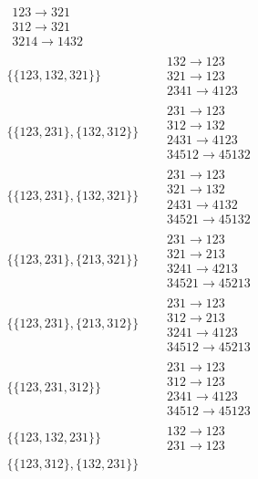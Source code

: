 \begin{tiny}
\begin{align}
\begin{matrix}
123 \to 321\\312 \to 321\\3214 \to 1432
\end{matrix}
\\
\{\{123, 132, 321\}\}
\quad
&
\begin{matrix}
132 \to 123\\321 \to 123\\2341 \to 4123
\end{matrix}
\\
\{\{123, 231\}, \{132, 312\}\}
\quad
&
\begin{matrix}
231 \to 123\\312 \to 132\\2431 \to 4123\\34512 \to 45132
\end{matrix}
\\
\{\{123, 231\}, \{132, 321\}\}
\quad
&
\begin{matrix}
231 \to 123\\321 \to 132\\2431 \to 4132\\34521 \to 45132
\end{matrix}
\\
\{\{123, 231\}, \{213, 321\}\}
\quad
&
\begin{matrix}
231 \to 123\\321 \to 213\\3241 \to 4213\\34521 \to 45213
\end{matrix}
\\
\{\{123, 231\}, \{213, 312\}\}
\quad
&
\begin{matrix}
231 \to 123\\312 \to 213\\3241 \to 4123\\34512 \to 45213
\end{matrix}
\\
\{\{123, 231, 312\}\}
\quad
&
\begin{matrix}
231 \to 123\\312 \to 123\\2341 \to 4123\\34512 \to 45123
\end{matrix}
\\
\{\{123, 132, 231\}\}
\quad
&
\begin{matrix}
132 \to 123\\231 \to 123
\end{matrix}
\\
\{\{123, 312\}, \{132, 231\}\}

\end{align}
\end{tiny}

